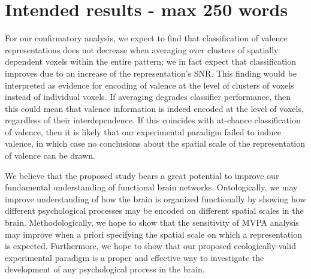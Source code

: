 \documentclass[12pt,a4paper]{article}\usepackage[]{graphicx}\usepackage[]{color}
\begin{document}
\noindent
\wordcount

\section{Intended results \textmd{- max 250 words}}

For our confirmatory analysis, we expect to find that classification of valence representations does not decrease when averaging over clusters of spatially dependent voxels within the entire pattern; we in fact expect that classification improves due to an increase of the representation's SNR. This finding would be interpreted as evidence for encoding of valence at the level of clusters of voxels instead of individual voxels. If averaging degrades classifier performance, then this could mean that valence information is indeed encoded at the level of voxels, regardless of their interdependence. If this coincides with at-chance classification of valence, then it is likely that our experimental paradigm failed to induce valence, in which case no conclusions about the spatial scale of the representation of valence can be drawn.  


We believe that the proposed study bears a great potential to improve our fundamental understanding of functional brain networks. Ontologically, we may improve understanding of how the brain is organized functionally by showing how different psychological processes may be encoded on different spatial scales in the brain. Methodologically, we hope to show that the sensitivity of MVPA analysis may improve when a priori specifying the spatial scale on which a representation is expected. Furthermore, we hope to show that our proposed ecologically-valid experimental paradigm is a proper and effective way to investigate the development of any psychological process in the brain.  

\noindent
\wordcount

\end{document}
